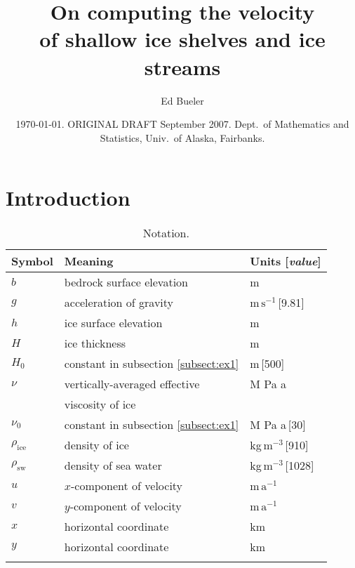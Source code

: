\documentclass[12pt]{amsart}%
\newcommand{\normalspacing}{\renewcommand{\baselinestretch}{1.1}\tiny\normalsize}
\newcommand{\tablespacing}{\renewcommand{\baselinestretch}{1.0}\tiny\normalsize}
\theoremstyle{plain}
\theoremstyle{definition}
\newcommand{\rhoi}{\ensuremath{\rho_{\text{ice}}}}
\newcommand{\rhosw}{\ensuremath{\rho_{\text{sw}}}}
\begin{document}
\title[Computing velocity for ice shelves and streams]{On computing the velocity \\ of shallow ice shelves and ice streams}

\author{Ed Bueler}

\date{\today.  ORIGINAL DRAFT September 2007.  Dept.~of Mathematics and Statistics, Univ.~of Alaska, Fairbanks.}

\maketitle
\thispagestyle{empty}

\section{Introduction}


\begin{table}[h] \small
\caption{Notation.}\label{tab:notation}
\begin{tabular}{lll}\hline
\textbf{Symbol} & \textbf{Meaning} & \textbf{Units [\emph{value}]}\\ \hline
$b$ & bedrock surface elevation & m \\
$g$ & acceleration of gravity & m\,$\text{s}^{-1}$\,[9.81] \\
$h$ & ice surface elevation & m \\
$H$ & ice thickness & m \\
$H_0$ & constant in subsection \ref{subsect:ex1} & m\,[500] \\
$\nu$ & vertically-averaged effective & M Pa a \\
 & \quad viscosity of ice &  \\
$\nu_0$ & constant in subsection \ref{subsect:ex1} & M Pa a\,[30] \\
$\rhoi$ & density of ice & kg\,$\text{m}^{-3}$\,[910] \\
$\rhosw$ & density of sea water & kg\,$\text{m}^{-3}$\,[1028] \\
$u$ & $x$-component of velocity & m\,$\text{a}^{-1}$ \\
$v$ & $y$-component of velocity & m\,$\text{a}^{-1}$ \\
$x$ & horizontal coordinate & km \\
$y$ & horizontal coordinate & km \\
\hline
\normalsize \end{tabular}
\end{table}
\end{document}
